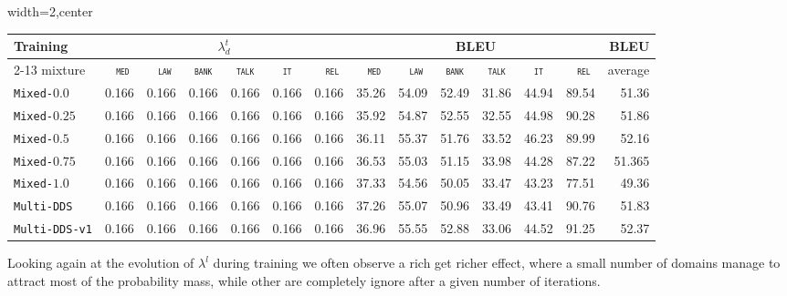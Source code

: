 \documentclass[11pt,a4paper]{article}
\newcommand{\fyTodo}[1]{\Todo[FY:]{\textcolor{orange}{#1}}}
\newcommand{\domain}[1]{\texttt{\textsc{#1}}}
\newcommand{\system}[1]{\texttt{{#1}}}
\begin{document}
\begin{table*}
  \centering%
  \begin{adjustbox}{width=2\columnwidth,center}
  \begin{tabular}{|p{3.0cm}|*{13}{r|}} \hline
    \multirow{2}{*}{Training} & \multicolumn{6}{|c}{$\lambda^t_d$} & \multicolumn{6}{|c|}{BLEU} & \multirow{2}{*}{BLEU} \\ \cline{2-13}	
  mixture & \multicolumn{1}{c|}{\domain{ med}} & \multicolumn{1}{c|}{\domain{ law}} & \multicolumn{1}{c|}{\domain{bank}} & \multicolumn{1}{c|}{\domain{talk}} & \multicolumn{1}{c|}{\domain{ it }} & \multicolumn{1}{c|}{\domain{ rel}} & \multicolumn{1}{c|}{\domain{ med}} & \multicolumn{1}{c|}{\domain{ law}} & \multicolumn{1}{c|}{\domain{bank}} & \multicolumn{1}{c|}{\domain{talk}} & \multicolumn{1}{c|}{\domain{ it }} & \multicolumn{1}{c|}{\domain{ rel}} & average \\
    \hline
  \system{Mixed-$0.0$} & 0.166&0.166 &0.166 &0.166 &0.166 & 0.166 & 35.26 &54.09 &52.49& 31.86& 44.94& 89.54& 51.36\\
  \system{Mixed-$0.25$} & 0.166&0.166 &0.166 &0.166 &0.166 & 0.166 &35.92& 54.87& 52.55& 32.55& 44.98& 90.28& 51.86\\
  \system{Mixed-$0.5$} & 0.166&0.166 &0.166 &0.166 &0.166 & 0.166 &36.11& 55.37& 51.76& 33.52& 46.23& 89.99& 52.16\\
  \system{Mixed-$0.75$} & 0.166&0.166 &0.166 &0.166 &0.166 & 0.166 &36.53&	55.03& 51.15& 33.98& 44.28& 87.22& 51.365\\
  \system{Mixed-$1.0$} & 0.166&0.166 &0.166 &0.166 &0.166 & 0.166 &37.33& 54.56& 50.05& 33.47& 43.23& 77.51& 49.36\\
  \system{Multi-DDS} & 0.166&0.166 &0.166 &0.166 &0.166 & 0.166 & 37.26 & 55.07&50.96&33.49&43.41&90.76& 51.83 \\
  \system{Multi-DDS-v1} & 0.166&0.166 &0.166 &0.166 &0.166 & 0.166 & 36.96 & 55.55 & 52.88 & 33.06 & 44.52 &91.25 & 52.37\\
  \hline
  \end{tabular}
\end{adjustbox}
  \label{tab:multidomains}
\end{table*}

Looking again at the evolution of $\lambda^l$ during training we often observe a rich get richer effect, where a small number of domains manage to attract most of the probability mass, while other are completely ignore after a given number of iterations.

\fyTodo{Explain issues}
\end{document}
